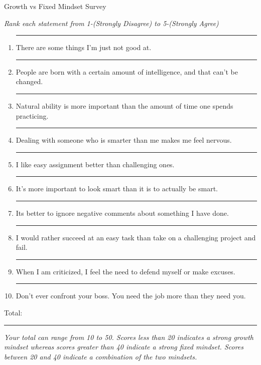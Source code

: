 \documentclass[letterpaper, 11pt]{article}
\begin{document}
	


\begin{center} Growth vs Fixed Mindset Survey
\end{center}

\textit{Rank each statement from 1-(Strongly Disagree) to 5-(Strongly Agree)}



\begin{enumerate}


	
	\item \rule{.5in}{.01in} There are some things I'm just not good at.
	\item \rule{.5in}{.01in} People are born with a certain amount of intelligence, and that can't be changed.
	\item \rule{.5in}{.01in} Natural ability is more important than the amount of time one spends practicing.
	\item \rule{.5in}{.01in} Dealing with someone who is smarter than me makes me feel nervous.
	\item \rule{.5in}{.01in} I like easy assignment better than challenging ones.
	\item \rule{.5in}{.01in} It's more important to look smart than it is to actually be smart.
	\item \rule{.5in}{.01in} Its better to ignore negative comments about something I have done.
	\item \rule{.5in}{.01in} I would rather succeed at an easy task than take on a challenging project and fail.
	\item \rule{.5in}{.01in} When I am criticized, I feel the need to defend myself or make excuses.
	\item \rule{.5in}{.01in} Don't ever confront your boss.  You need the job more than they need you.
	
\end{enumerate}
 
Total: \rule{.5in}{.01in}
\vspace{.5in}

\textit{Your total can range from 10 to 50.  Scores less than 20 indicates a strong growth mindset whereas scores greater than 40 indicate a strong fixed mindset. Scores between 20 and 40 indicate a combination of the two mindsets.}
\end{document}
